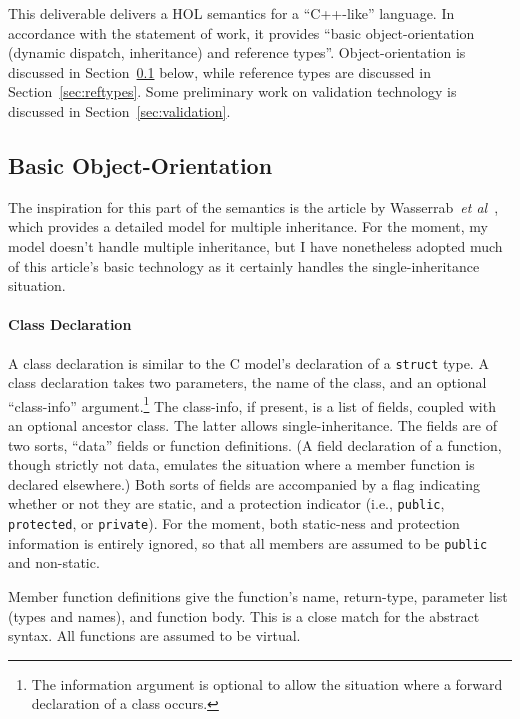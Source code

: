 \documentclass[11pt]{article}
\newcommand{\cpp}{\mbox{C\hspace{-0.5pt}+\hspace{-1.5pt}+}}
\begin{document}
This deliverable delivers a HOL semantics for a ``\cpp-like''
language.  In accordance with the statement of work, it provides
``basic object-orientation (dynamic dispatch, inheritance) and
reference types''.  Object-orientation is discussed in
Section~\ref{sec:basic-oo} below, while reference types are discussed
in Section~\ref{sec:reftypes}.  Some preliminary work on validation
technology is discussed in Section~\ref{sec:validation}.

\subsection{Basic Object-Orientation}
\label{sec:basic-oo}

The inspiration for this part of the semantics is the article by
Wasserrab~\emph{et al}~\cite{wasserrab-nst-OOPSLA06}, which provides a
detailed model for multiple inheritance.  For the moment, my model
doesn't handle multiple inheritance, but I have nonetheless adopted
much of this article's basic technology as it certainly handles the
single-inheritance situation.

\paragraph{Class Declaration}
A class declaration is similar to the C model's declaration of a
\texttt{struct} type.  A class declaration takes two parameters, the
name of the class, and an optional ``class-info''
argument.\footnote{The information argument is optional to allow the
  situation where a forward declaration of a class occurs.}  The
class-info, if present, is a list of fields, coupled with an optional
ancestor class.  The latter allows single-inheritance.  The fields are
of two sorts, ``data'' fields or function definitions.  (A field
declaration of a function, though strictly not data, emulates the
situation where a member function is declared elsewhere.)  Both sorts
of fields are accompanied by a flag indicating whether or not they are
static, and a protection indicator (i.e., \texttt{public},
\texttt{protected}, or \texttt{private}).  For the moment, both
static-ness and protection information is entirely ignored, so that
all members are assumed to be \texttt{public} and non-static.

Member function definitions give the function's name, return-type,
parameter list (types and names), and function body.  This is a close
match for the abstract syntax.  All functions are assumed to be
virtual.
\end{document}
